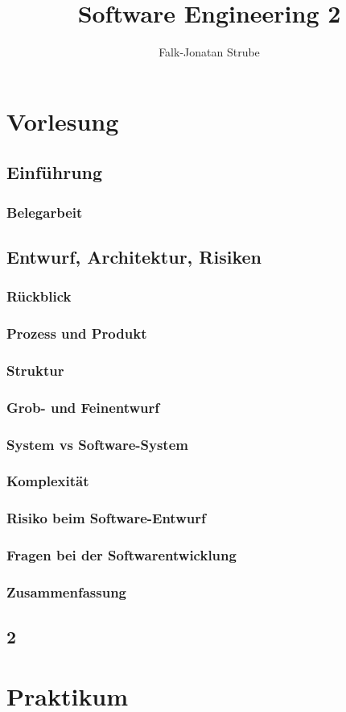 \documentclass{scrreprt}
\title{Software Engineering 2}
\author{Falk-Jonatan Strube}
\begin{document}
\maketitle
\tableofcontents
\part{Vorlesung}
\chapter*{Einführung}
\section*{Belegarbeit}
\chapter{Entwurf, Architektur, Risiken}
\section{Rückblick}
\section{Prozess und Produkt}
\section{Struktur}
\section{Grob- und Feinentwurf}
\section{System vs Software-System}
\section{Komplexität}
\section{Risiko beim Software-Entwurf}
\section{Fragen bei der Softwarentwicklung}
\section{Zusammenfassung}

\chapter{2}


\part{Praktikum}
\setcounter{chapter}{0}

\end{document}
